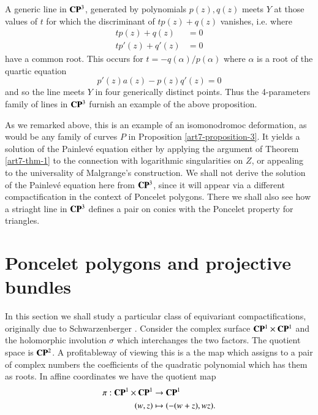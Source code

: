 \begin{example*}
\begin{enumerate}[]
A generic line in $\mathbf{C}\mathbf{P}^{3}$, generated by polynomials $p(z), q(z)$ meets $Y$ at those values of $t$ for which the discriminant of $tp(z) + q(z)$ vanishes, i.e. where
\begin{align*}
tp(z) +q(z) &= 0\\
tp'(z)+q'(z) &= 0
\end{align*}
have a common root. This occurs for $t = -q(\alpha)/p(\alpha)$ where $\alpha$ is a root of the quartic equation
$$
p'(z)a(z)-p(z)q'(z) =0
$$
and so the line meets $Y$ in four generically distinct points. Thus the 4-parameters family of lines in $\mathbf{C}\mathbf{P}^{3}$ furnish an example of the above proposition.
\end{enumerate}
As we remarked above, this is an example of an isomonodromoc deformation, as would be any family of curves $P$ in Proposition \ref{art7-proposition-3}. It yields a solution of the Painlev\'e equation either by applying the argument of Theorem \ref{art7-thm-1} to the connection with logarithmic singularities on $Z$, or appealing to the universality of Malgrange's construction. We shall not derive the solution of the Painlev\'e equation here from $\mathbf{C}\mathbf{P}^{3}$, since it will appear via a different compactification in the context of Poncelet polygons. There we shall also see how a striaght line in $\mathbf{C}\mathbf{P}^{3}$ defines a pair on conics with the Poncelet property for triangles.
\end{example*}

\section{Poncelet polygons and projective bundles}\label{art7-sec-4}
In this section we shall study a particular class of equivariant compactifications, originally due to Schwarzenberger \cite{art7-key16}. Consider the complex surface $\mathbf{C}\mathbf{P}^{1}\times \mathbf{C}\mathbf{P}^{1}$ and the holomorphic involution $\sigma$ which interchanges the two factors. The quotient space is $\mathbf{C}\mathbf{P}^{2}$. A profitableway of viewing this is a the map which assigns to a pair of complex numbers the coefficients of the quadratic polynomial which has them as roots. In affine coordinates we have the quotient map
\begin{align*}
\pi : \mathbf{C}\mathbf{P}^{1} \times \mathbf{C}\mathbf{P}^{1} &\rightarrow \mathbf{C}\mathbf{P}^{1}\\
(w, z) &\mapsto (-(w +z), wz).
\end{align*}
